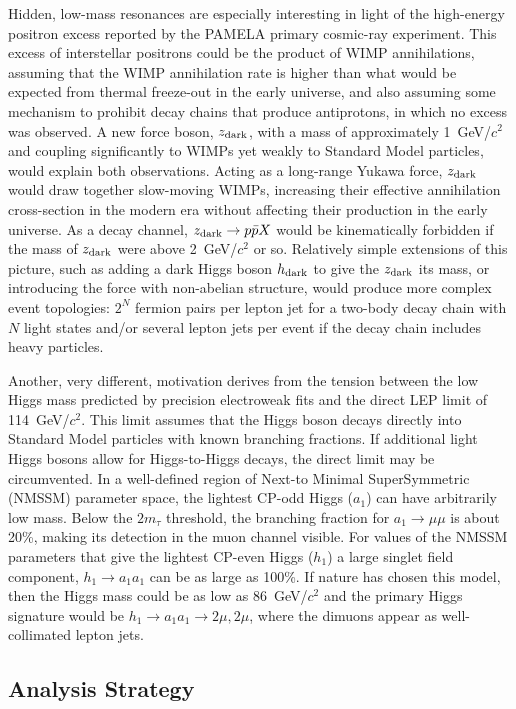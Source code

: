 \documentclass[12pt]{cms-tdr}
\newcommand{\s}[1]{{\mbox{\scriptsize #1}}}
\begin{document}
Hidden, low-mass resonances are especially interesting in light of the
high-energy positron excess reported by the PAMELA primary cosmic-ray
experiment.  This excess of interstellar positrons could be the
product of WIMP annihilations, assuming that the WIMP annihilation
rate is higher than what would be expected from thermal freeze-out in
the early universe, and also assuming some mechanism to prohibit decay
chains that produce antiprotons, in which no excess was observed.  A
new force boson, $z_\s{dark}$, with a mass of approximately
1~GeV/$c^2$ and coupling significantly to WIMPs yet weakly to Standard
Model particles, would explain both observations.  Acting as a
long-range Yukawa force, $z_\s{dark}$ would draw together slow-moving
WIMPs, increasing their effective annihilation cross-section in the
modern era without affecting their production in the early universe.
As a decay channel, $z_\s{dark} \to p\bar{p} X$ would be kinematically
forbidden if the mass of $z_\s{dark}$ were above 2~GeV/$c^2$ or so.
Relatively simple extensions of this picture, such as adding a dark
Higgs boson $h_\s{dark}$ to give the $z_\s{dark}$ its mass, or
introducing the force with non-abelian structure, would produce more
complex event topologies: $2^N$ fermion pairs per lepton jet for a
two-body decay chain with $N$ light states and/or several lepton jets
per event if the decay chain includes heavy particles.

Another, very different, motivation derives from the tension between
the low Higgs mass predicted by precision electroweak fits and the
direct LEP limit of 114~GeV/$c^2$.  This limit assumes that the Higgs
boson decays directly into Standard Model particles with known
branching fractions.  If additional light Higgs bosons allow for
Higgs-to-Higgs decays, the direct limit may be circumvented.  In a
well-defined region of Next-to Minimal SuperSymmetric (NMSSM)
parameter space, the lightest CP-odd Higgs ($a_1$) can have
arbitrarily low mass.  Below the $2m_\tau$ threshold, the branching
fraction for $a_1 \to \mu\mu$ is about 20\%, making its detection in
the muon channel visible.  For values of the NMSSM parameters that
give the lightest CP-even Higgs ($h_1$) a large singlet field
component, $h_1 \to a_1 a_1$ can be as large as 100\%.  If nature has
chosen this model, then the Higgs mass could be as low as 86~GeV/$c^2$
and the primary Higgs signature would be $h_1 \to a_1 a_1 \to 2\mu,
2\mu$, where the dimuons appear as well-collimated lepton jets.

\subsection{Analysis Strategy}
\end{document}
